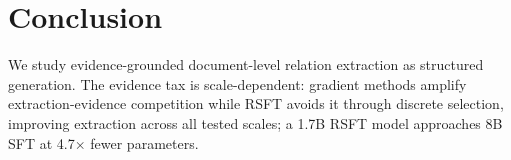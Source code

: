 \section{Conclusion}
\label{sec:conclusion}

We study evidence-grounded document-level relation extraction as structured generation. The evidence tax is scale-dependent: gradient methods amplify extraction-evidence competition while RSFT avoids it through discrete selection, improving extraction across all tested scales; a 1.7B RSFT model approaches 8B SFT at 4.7$\times$ fewer parameters.

